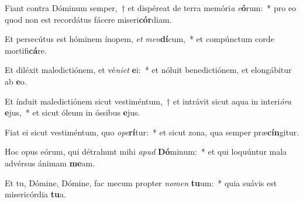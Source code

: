 \item Fiant contra Dóminum semper,~† et dispéreat de terra memóri\textit{a} \textit{e}\textbf{ó}rum:~* pro eo quod non est recordátus fácere miseri\textbf{cór}diam.
\item Et persecútus est hóminem ínopem, \textit{et} \textit{men}\textbf{dí}cum,~* et compúnctum corde mortifi\textbf{cá}re.
\item Et diléxit maledictiónem, et vé\textit{ni}\textit{et} \textbf{e}i:~* et nóluit benedictiónem, et elongábitur ab \textbf{e}o.
\item Et índuit maledictiónem sicut vestiméntum,~† et intrávit sicut aqua in interi\textit{ó}\textit{ra} \textbf{e}jus,~* et sicut óleum in óssibus \textbf{e}jus.
\item Fiat ei sicut vestiméntum, quo \textit{o}\textit{pe}\textbf{rí}tur:~* et sicut zona, qua semper præ\textbf{cín}gitur.
\item Hoc opus eórum, qui détrahunt mihi \textit{a}\textit{pud} \textbf{Dó}minum:~* et qui loquúntur mala advérsus ánimam \textbf{me}am.
\item Et tu, Dómine, Dómine, fac mecum propter \textit{no}\textit{men} \textbf{tu}um:~* quia suávis est misericórdia \textbf{tu}a.
